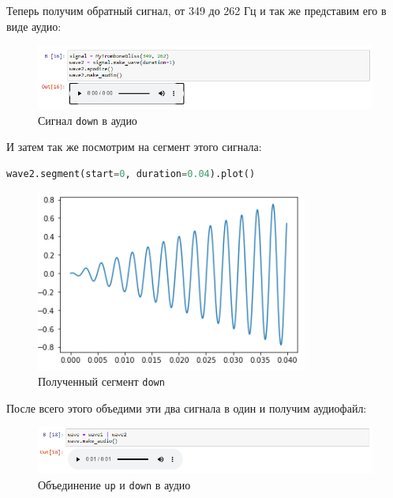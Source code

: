 \documentclass[a4paper]{article}
\begin{document}
            Теперь получим обратный сигнал, от 349 до 262 Гц и так же представим его в виде аудио:
            
             \begin{figure}[H]
                \centering
                \includegraphics[width=\textwidth]{ex_5_signal_down_audio.png}
                \caption{Сигнал \texttt{down} в аудио}
                \label{fig:ex_5_signal_up_audio}
            \end{figure}
            
            И затем так же посмотрим на сегмент этого сигнала:
            
\begin{lstlisting}[language=Python, caption= Сегмент сигнала \texttt{down}]
    wave2.segment(start=0, duration=0.04).plot()
\end{lstlisting}   
            
             \begin{figure}[H]
                \centering
                \includegraphics{ex_5_signal_down_segment.png}
                \caption{Полученный сегмент \texttt{down}}
                \label{fig:ex_5_signal_down_segment}
            \end{figure}
            
            После всего этого объедими эти два сигнала в один и получим аудиофайл:
            
            \begin{figure}[H]
                \centering
                \includegraphics[width=\textwidth]{ex_5_signal_up_down_audio.png}
                \caption{Объединение \texttt{up} и \texttt{down} в аудио}
                \label{fig:ex_5_signal_up_down_audio}
            \end{figure}
            
\end{document}
